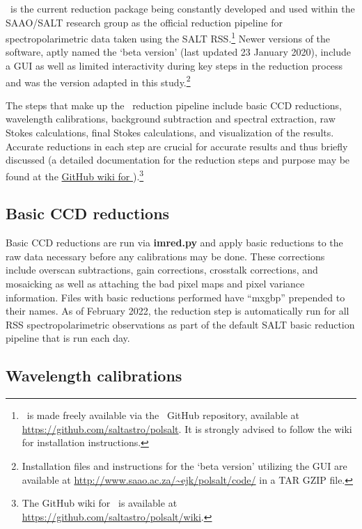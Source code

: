 \polsalt\ is the current reduction package being constantly developed and used within the \gls{SAAO}/\gls{SALT} research group as the official reduction pipeline for spectropolarimetric data taken using the \gls{SALT} \gls{RSS}.\footnote{\polsalt\ is made freely available via the \polsalt\ GitHub repository, available at \url{https://github.com/saltastro/polsalt}. It is strongly advised to follow the wiki for installation instructions.} Newer versions of the software, aptly named the `beta version' (last updated 23 January 2020), include a \gls{GUI} as well as limited interactivity during key steps in the reduction process and was the version adapted in this study.\footnote{Installation files and instructions for the `beta version' utilizing the \gls{GUI} are available at \url{http://www.saao.ac.za/~ejk/polsalt/code/} in a TAR GZIP file.}

The steps that make up the \polsalt\ reduction pipeline include basic \gls{CCD} reductions, wavelength calibrations, background subtraction and spectral extraction, raw Stokes calculations, final Stokes calculations, and visualization of the results. Accurate reductions in each step are crucial for accurate results and thus briefly discussed (a detailed documentation for the reduction steps and purpose may be found at the \href{https://github.com/saltastro/polsalt/wiki}{GitHub wiki for \polsalt}).\footnote{The GitHub wiki for \polsalt\ is available at \url{https://github.com/saltastro/polsalt/wiki}.}

\subsection{Basic CCD reductions}

Basic \gls{CCD} reductions are run via \textbf{imred.py} and apply basic reductions to the raw data necessary before any calibrations may be done. These corrections include overscan subtractions, gain corrections, crosstalk corrections, and mosaicking as well as attaching the bad pixel maps and pixel variance information. Files with basic reductions performed have ``mxgbp'' prepended to their names. As of February 2022, the reduction step is automatically run for all RSS spectropolarimetric observations as part of the default SALT basic reduction pipeline that is run each day.

\subsection{Wavelength calibrations}

